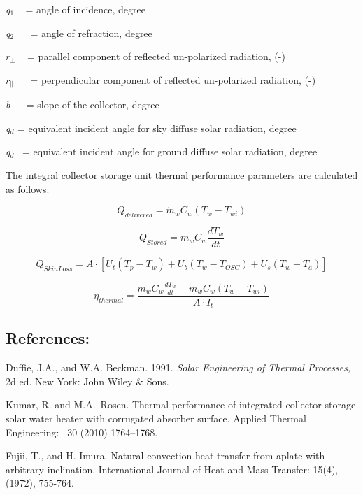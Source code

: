 \emph{q}\(_{1}\) ~ = angle of incidence, degree

\emph{q}\(_{2}\) ~~ = angle of refraction, degree

\({r_ \bot }\) ~ = parallel component of reflected un-polarized radiation, (-)

\({r_\parallel }\) ~~ = perpendicular component of reflected un-polarized radiation, (-)

\emph{b} ~~ = slope of the collector, degree

\emph{q}\(_{d}\) = equivalent incident angle for sky diffuse solar radiation, degree

\emph{q}\(_{d}\)~ = equivalent incident angle for ground diffuse solar radiation, degree

The integral collector storage unit thermal performance parameters are calculated as follows:

\begin{equation}
{Q_{delivered}} = {\dot m_w}{C_w}\left( {{T_w} - {T_{wi}}} \right)
\end{equation}

\begin{equation}
{Q_{Stored}} = {m_w}{C_w}\frac{{d{T_w}}}{{dt}}
\end{equation}

\begin{equation}
{Q_{SkinLoss}} = A \cdot \left[ {{U_t}\left( {{T_p} - {T_w}} \right) + {U_b}\left( {{T_w} - {T_{OSC}}} \right) + {U_s}\left( {{T_w} - {T_a}} \right)} \right]
\end{equation}

\begin{equation}
{\eta_{thermal}} = \frac{{{m_w}{C_w}\frac{{d{T_w}}}{{dt}} + {{\dot m}_w}{C_w}\left( {{T_w} - {T_{wi}}} \right)}}{{A \cdot {I_t}}}
\end{equation}

\subsection{References:}\label{references-1-016}

Duffie, J.A., and W.A. Beckman. 1991. \emph{Solar Engineering of Thermal Processes,} 2d ed. New York: John Wiley \& Sons.

Kumar, R. and M.A.~Rosen. Thermal performance of integrated collector storage solar water heater with corrugated absorber surface. Applied Thermal Engineering:~ 30 (2010) 1764--1768.

Fujii, T., and H. Imura. Natural convection heat transfer from aplate with arbitrary inclination. International Journal of Heat and Mass Transfer: 15(4), (1972), 755-764.

